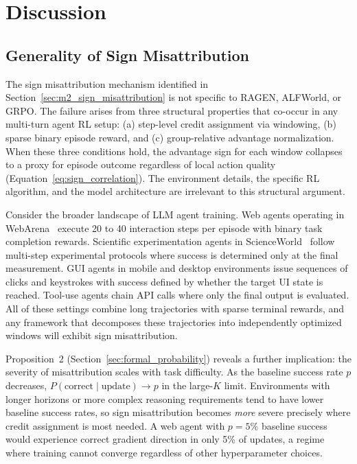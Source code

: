 \section{Discussion}
\label{sec:discussion}

\subsection{Generality of Sign Misattribution}
\label{sec:discussion_generality}

The sign misattribution mechanism identified in Section~\ref{sec:m2_sign_misattribution} is not specific to RAGEN, ALFWorld, or GRPO. The failure arises from three structural properties that co-occur in any multi-turn agent RL setup: (a) step-level credit assignment via windowing, (b) sparse binary episode reward, and (c) group-relative advantage normalization. When these three conditions hold, the advantage sign for each window collapses to a proxy for episode outcome regardless of local action quality (Equation~\ref{eq:sign_correlation}). The environment details, the specific RL algorithm, and the model architecture are irrelevant to this structural argument.

Consider the broader landscape of LLM agent training. Web agents operating in WebArena~\cite{zhou2024webarena} execute 20 to 40 interaction steps per episode with binary task completion rewards. Scientific experimentation agents in ScienceWorld~\cite{wang2022scienceworld} follow multi-step experimental protocols where success is determined only at the final measurement. GUI agents in mobile and desktop environments issue sequences of clicks and keystrokes with success defined by whether the target UI state is reached. Tool-use agents chain API calls where only the final output is evaluated. All of these settings combine long trajectories with sparse terminal rewards, and any framework that decomposes these trajectories into independently optimized windows will exhibit sign misattribution.

Proposition~2 (Section~\ref{sec:formal_probability}) reveals a further implication: the severity of misattribution scales with task difficulty. As the baseline success rate $p$ decreases, $P(\text{correct} \mid \text{update}) \to p$ in the large-$K$ limit. Environments with longer horizons or more complex reasoning requirements tend to have lower baseline success rates, so sign misattribution becomes \textit{more} severe precisely where credit assignment is most needed. A web agent with $p = 5\%$ baseline success would experience correct gradient direction in only 5\% of updates, a regime where training cannot converge regardless of other hyperparameter choices.

